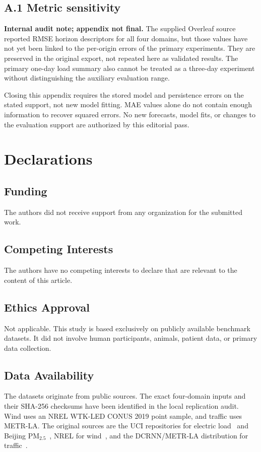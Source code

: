 \documentclass[pdflatex]{sn-jnl}
\begin{document}
\appendix

\subsection*{A.1 Metric sensitivity}

\textbf{Internal audit note; appendix not final.} The supplied Overleaf
source reported RMSE horizon descriptors for all four domains, but those
values have not yet been linked to the per-origin errors of the primary
experiments. They are preserved in the original export, not repeated here
as validated results. The primary one-day load summary also cannot be
treated as a three-day experiment without distinguishing the auxiliary
evaluation range.

Closing this appendix requires the stored model and persistence errors
on the stated support, not new model fitting. MAE values alone do not
contain enough information to recover squared errors. No new forecasts,
model fits, or changes to the evaluation support are authorized by this
editorial pass.

\section*{Declarations}

\subsection*{Funding}
The authors did not receive support from any organization for the submitted work.

\subsection*{Competing Interests}
The authors have no competing interests to declare that are relevant to the content of this article.

\subsection*{Ethics Approval}
Not applicable. This study is based exclusively on publicly available benchmark datasets. It did not involve human participants, animals, patient data, or primary data collection.

\subsection*{Data Availability}
The datasets originate from public sources. The exact four-domain inputs
and their SHA-256 checksums have been identified in the local replication
audit. Wind uses an NREL WTK-LED CONUS 2019 point sample, and traffic uses
METR-LA. The original sources are the UCI
repositories for electric load~\citep{trindade2015} and Beijing
PM$_{2.5}$~\citep{chen2015beijingpm25}, NREL for wind~\citep{draxl2015}, and
the DCRNN/METR-LA distribution for traffic~\citep{li2018dcrnn}.
\end{document}
